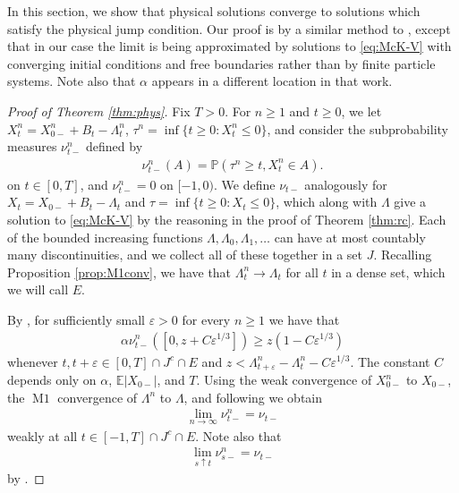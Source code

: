 \documentclass[12pt]{amsart}
\newcommand{\veps}{\varepsilon}
\newcommand{\bP}{\mathbb{P}}
\newcommand{\E}{\mathbb{E}}
\theoremstyle{plain}
\theoremstyle{definition}
\begin{document}
In this section, we show that physical solutions converge to solutions which satisfy the physical jump condition. Our proof is by a similar method to \cite[Proof of Theorem 6.4]{cuchiero_propagation_2020}, except that in our case the limit is being approximated by solutions to \eqref{eq:McK-V} with converging initial conditions and free boundaries rather than by finite particle systems. Note also that $\alpha$ appears in a different location in that work.

\begin{proof}[Proof of Theorem \ref{thm:phys}]
Fix $T>0$. For $n \ge 1$ and $t \ge 0$, we let $X_t^n=X_{0-}^n+B_t- \Lambda^n_t$, $\tau^n=\inf \{t\ge 0:X_t^n\le 0\}$, and consider the subprobability measures $\nu_{t-}^n$ defined by 
\begin{align}
\nu_{t-}^n(A)=\bP (\tau^n \ge t, X_t^n\in A).
\end{align}
on $t\in [0,T]$, and $\nu_{t-}^n=0$ on $[-1,0)$.
We define $\nu_{t-}$ analogously for $X_t=X_{0-}+B_t- \Lambda_t$ and $\tau=\inf \{t\ge 0:X_t\le 0\}$, which along with $\Lambda$ give a solution to \eqref{eq:McK-V} by the reasoning in the proof of Theorem \ref{thm:rc}.
 Each of the bounded increasing functions $\Lambda, \Lambda_0, \Lambda_1,\dots$ can have at most countably many discontinuities, and we collect all of these together in a set $J$. Recalling Proposition \ref{prop:M1conv}, we have that $\Lambda^n_t\to\Lambda_t$ for all $t$ in a dense set, which we will call $E$.
 
\medskip

By \cite[Proof of Theorem 6.4, Step 2]{cuchiero_propagation_2020}, for sufficiently small $\veps>0$ for every $n\ge 1$ we have that
\begin{align}
\alpha\nu_{t-}^n([0,z+C\veps^{1/3}])\ge z(1-C\veps^{1/3})
\end{align}
whenever $t,t+\veps\in[0,T]\cap J^c\cap E$ and $z<\Lambda^n_{t+\veps}-\Lambda^n_{t}-C\veps^{1/3}$. The constant $C$ depends only on $\alpha$, $\E|X_{0-}|$, and $T$. 
Using the weak convergence of $X_{0-}^n$ to $X_{0-}$, the $\operatorname{M1}$ convergence of $\Lambda^n$ to $\Lambda$, and following \cite[Proof of Theorem 6.4, Step 1]{cuchiero_propagation_2020} we obtain
\begin{align}\label{eq:subprobn}
\lim_{n\to\infty}\nu_{t-}^n=\nu_{t-}
\end{align}
weakly at all $t\in [-1,T]\cap J^c\cap E$. Note also that 
\begin{align}\label{eq:subprobtime}
\lim_{s\uparrow t}\nu_{s-}^n=\nu_{t-}
\end{align}
by \cite[Proof of Theorem 6.4, first argument of Step 2]{cuchiero_propagation_2020}.


\end{proof}
\end{document}
